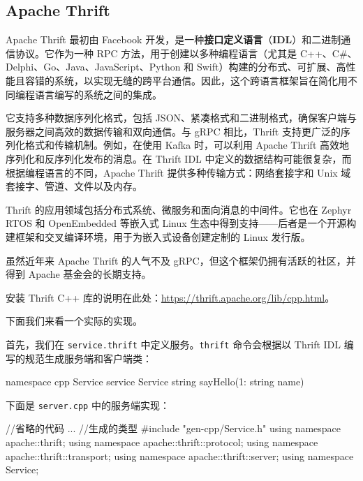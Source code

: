 \subsection{Apache Thrift}

\label{idx:1685}
\label{idx:1686}
\label{idx:1687}
Apache Thrift 最初由 Facebook 开发，是一种\textbf{接口定义语言}（\textbf{IDL}）和二进制通信协议。它作为一种 RPC 方法，用于创建以多种编程语言（尤其是 C++、C\#、Delphi、Go、Java、JavaScript、Python 和 Swift）构建的分布式、可扩展、高性能且容错的系统，以实现无缝的跨平台通信。因此，这个跨语言框架旨在简化用不同编程语言编写的系统之间的集成。

它支持多种数据序列化格式，包括 JSON、紧凑格式和二进制格式，确保客户端与服务器之间高效的数据传输和双向通信。与 gRPC 相比，Thrift 支持更广泛的序列化格式和传输机制。例如，在使用 Kafka 时，可以利用 Apache Thrift 高效地序列化和反序列化发布的消息。在 Thrift IDL 中定义的数据结构可能很复杂，而根据编程语言的不同，Apache Thrift 提供多种传输方式：网络套接字和 Unix 域套接字、管道、文件以及内存。

\label{idx:1688}
Thrift 的应用领域包括分布式系统、微服务和面向消息的中间件。它也在 Zephyr RTOS 和 OpenEmbedded 等嵌入式 Linux 生态中得到支持——后者是一个开源构建框架和交叉编译环境，用于为嵌入式设备创建定制的 Linux 发行版。

虽然近年来 Apache Thrift 的人气不及 gRPC，但这个框架仍拥有活跃的社区，并得到 Apache 基金会的长期支持。

安装 Thrift C++ 库的说明在此处：\href{https://thrift.apache.org/lib/cpp.html}{https://thrift.apache.org/lib/cpp.html}。

下面我们来看一个实际的实现。

首先，我们在 \texttt{service.\allowbreak{}thrift} 中定义服务。\texttt{thrift} 命令会根据以 Thrift IDL 编写的规范生成服务端和客户端类：

\begin{codebox}[text]
namespace cpp Service
service Service {
  string sayHello(1: string name)
}
\end{codebox}

下面是 \texttt{server.\allowbreak{}cpp} 中的服务端实现：

\begin{codebox}[cpp]
//省略的代码
...
//生成的类型
#include "gen-cpp/Service.h"
using namespace apache::thrift;
using namespace apache::thrift::protocol;
using namespace apache::thrift::transport;
using namespace apache::thrift::server;
using namespace Service;
\end{codebox}

